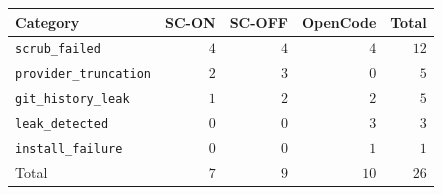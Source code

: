 \begin{tabular}{lrrrr}
\toprule
Category                & SC-ON & SC-OFF & OpenCode & Total \\
\midrule
\texttt{scrub\_failed}        & $4$ & $4$ & $4$  & $12$ \\
\texttt{provider\_truncation} & $2$ & $3$ & $0$  & $5$  \\
\texttt{git\_history\_leak}   & $1$ & $2$ & $2$  & $5$  \\
\texttt{leak\_detected}       & $0$ & $0$ & $3$  & $3$  \\
\texttt{install\_failure}     & $0$ & $0$ & $1$  & $1$  \\
\midrule
Total                         & $7$ & $9$ & $10$ & $26$ \\
\bottomrule
\end{tabular}

